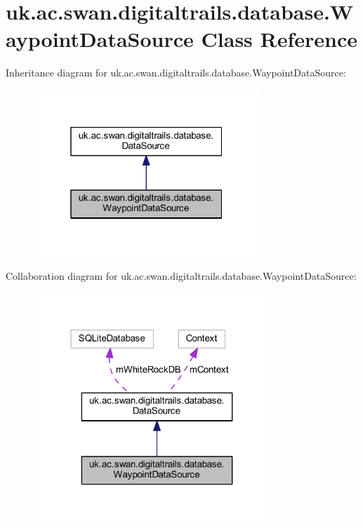 \hypertarget{classuk_1_1ac_1_1swan_1_1digitaltrails_1_1database_1_1_waypoint_data_source}{\section{uk.\+ac.\+swan.\+digitaltrails.\+database.\+Waypoint\+Data\+Source Class Reference}
\label{classuk_1_1ac_1_1swan_1_1digitaltrails_1_1database_1_1_waypoint_data_source}
}


Inheritance diagram for uk.\+ac.\+swan.\+digitaltrails.\+database.\+Waypoint\+Data\+Source\+:\nopagebreak
\begin{figure}[H]
\begin{center}
\leavevmode
\includegraphics[width=241pt]{classuk_1_1ac_1_1swan_1_1digitaltrails_1_1database_1_1_waypoint_data_source__inherit__graph}
\end{center}
\end{figure}


Collaboration diagram for uk.\+ac.\+swan.\+digitaltrails.\+database.\+Waypoint\+Data\+Source\+:\nopagebreak
\begin{figure}[H]
\begin{center}
\leavevmode
\includegraphics[width=253pt]{classuk_1_1ac_1_1swan_1_1digitaltrails_1_1database_1_1_waypoint_data_source__coll__graph}
\end{center}
\end{figure}

